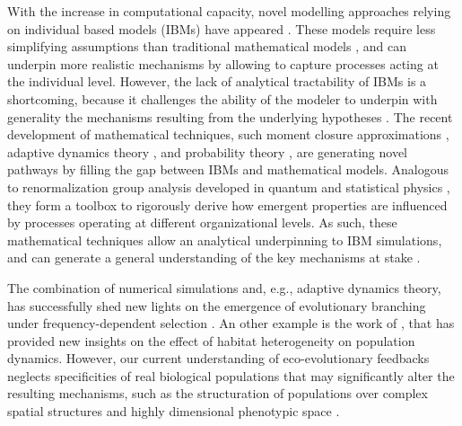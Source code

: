 With the increase in computational capacity, novel modelling approaches relying on individual based models (IBMs) have appeared \citep{deangelis2005individual}. These models require less simplifying assumptions than traditional mathematical models \citep{deangelis2005individual}, and can underpin more realistic mechanisms by allowing to capture processes acting at the individual level. However, the lack of analytical tractability of IBMs is a shortcoming, because it challenges the ability of the modeler to underpin with generality the mechanisms resulting from the underlying hypotheses \citep{Lion2016,May2004}.
% 
The recent development of mathematical techniques, such moment closure approximations \citep{law1999moment,Gandhi2000,Nordbotten2020,Lion2016}, adaptive dynamics theory \citep{Metz1995}, and probability theory \citep{Champagnat2006}, are generating novel pathways by filling the gap between IBMs and mathematical models. 
% 
% 
Analogous to renormalization group analysis developed in quantum and statistical physics \citep{Sayama}, they form a toolbox to rigorously derive how emergent properties are influenced by processes operating at different organizational levels. As such, these mathematical techniques allow an analytical underpinning to IBM simulations, and can generate a general understanding of the key mechanisms at stake \citep{Lion2016}.

The combination of numerical simulations and, e.g., adaptive dynamics theory, has successfully shed new lights on the emergence of evolutionary branching under frequency-dependent selection \citep{Dieckmann1999,Doebeli2003}.
%
An other example is the work of \cite{Meszena1997,Debarre2013a, Mirrahimi2020}, that has provided new insights on the effect of habitat heterogeneity on population dynamics. 
% 
However, our current understanding of eco-evolutionary feedbacks neglects specificities of real biological populations that may significantly alter the resulting mechanisms, such as the structuration of populations over complex spatial structures \citep{Nowak2001a} and highly dimensional phenotypic space \citep{Doebeli2010}.

